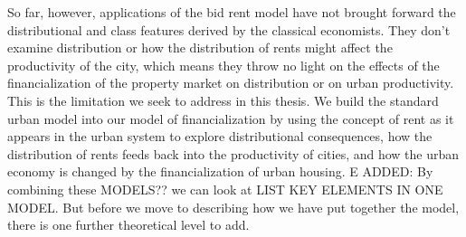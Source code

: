 So far, however, applications of the bid rent model have not brought forward the distributional and class features derived by the classical economists. They don't examine distribution or how the distribution of rents might affect the productivity of the city, which means they throw no light on the effects of the financialization of the property market on distribution or on urban productivity.  This is the limitation we seek to address in this thesis. We build the  standard urban model into our model of financialization by using the concept of rent as it appears in the urban system to explore distributional consequences, how the distribution of rents feeds back into the productivity of cities, and how the urban economy is changed by the financialization of urban housing. %
E ADDED: By combining these MODELS?? we can look at LIST KEY ELEMENTS IN ONE MODEL. But before we move to describing how we have put together the model, there is one further theoretical level to add. 




% 